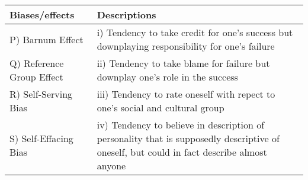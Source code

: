  \begin{tabular}{|l|p{7cm}|}
        \hline
        \textbf{Biases/effects} & \textbf{Descriptions} \\
        \hline
        P) Barnum Effect & i) Tendency to take credit for one’s success but downplaying responsibility for one’s failure \\
        Q) Reference Group Effect & ii) Tendency to take blame for failure but downplay one’s role in the success \\
        R) Self-Serving Bias & iii) Tendency to rate oneself with repect to one’s social and cultural group \\
        S) Self-Effacing Bias & iv) Tendency to believe in description of personality that is supposedly descriptive of oneself, but could in fact describe almost anyone \\
        \hline
    \end{tabular}

